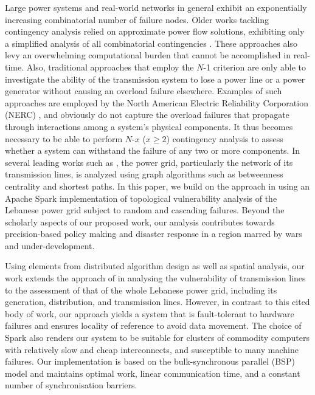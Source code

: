 Large power systems and real-world networks in general exhibit an exponentially increasing combinatorial number of failure nodes. Older works tackling contingency analysis relied on approximate power flow solutions, exhibiting only a simplified analysis of all combinatorial contingencies \cite{EjebeAl79,Ekwue91}. These approaches also levy an overwhelming computational burden that cannot be accomplished in real-time. Also, traditional approaches that employ the $N$-1 criterion are only able to investigate the ability of the transmission system to lose a power line or a power generator without causing an overload failure elsewhere. Examples of such approaches are employed by the North American Electric Reliability Corporation (NERC) \cite{JinAl10}, and obviously do not capture the overload failures that propagate through interactions among a system's physical components. It thus becomes necessary to be able to perform $N$-$x$ ($x \geq2$) contingency analysis to assess whether a system can withstand the failure of any two or more components. In several leading works such as \cite{2000Natur.406..378A,JinAl10, DaqingAl14}, the power grid, particularly the network of its transmission lines, is analyzed using graph algorithms such as betweenness centrality and shortest paths. In this paper, we build on the approach in  \cite{2000Natur.406..378A} using an Apache Spark implementation of topological vulnerability analysis of the Lebanese power grid subject to random  and cascading failures. Beyond the scholarly aspects of our proposed work, our analysis contributes towards precision-based policy making and disaster response in a region marred by wars and under-development. 
 
Using elements from distributed algorithm design as well as spatial analysis, our work extends the approach of \cite{2000Natur.406..378A} in analysing the vulnerability of transmission lines to the assessment of that of the whole Lebanese power grid, including its generation, distribution, and transmission lines. However, in contrast to this cited body of work, our approach yields a system that is fault-tolerant to hardware failures and ensures locality of reference to avoid data movement. The choice of Spark also renders our system to be suitable for clusters of commodity computers with relatively slow and cheap interconnects, and susceptible to many machine failures. Our implementation is based on the bulk-synchronous parallel (BSP)~\cite{bsp} model and maintains optimal work, linear communication time, and a constant number of synchronisation barriers. 


